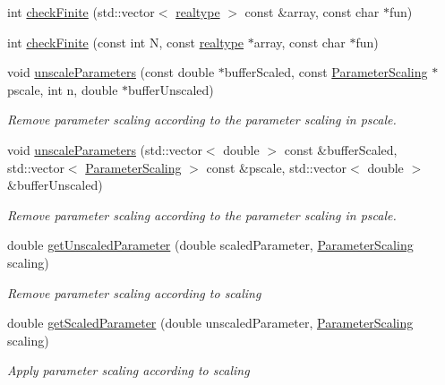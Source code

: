 \begin{DoxyCompactItemize}
int \mbox{\hyperlink{namespaceamici_a1c2cd160b1b5061e19257f2a7947c8ed}{check\+Finite}} (std\+::vector$<$ \mbox{\hyperlink{namespaceamici_a1bdce28051d6a53868f7ccbf5f2c14a3}{realtype}} $>$ const \&array, const char $\ast$fun)
\item 
int \mbox{\hyperlink{namespaceamici_aeb0886d5a74ea04eeef52219063aa7d4}{check\+Finite}} (const int N, const \mbox{\hyperlink{namespaceamici_a1bdce28051d6a53868f7ccbf5f2c14a3}{realtype}} $\ast$array, const char $\ast$fun)
\item 
void \mbox{\hyperlink{namespaceamici_af7d0af67f181a659c78b7aa2bbaaf718}{unscale\+Parameters}} (const double $\ast$buffer\+Scaled, const \mbox{\hyperlink{namespaceamici_a42f062082226e9284c201d9eab71a3a0}{Parameter\+Scaling}} $\ast$pscale, int n, double $\ast$buffer\+Unscaled)
\begin{DoxyCompactList}\small\item\em Remove parameter scaling according to the parameter scaling in pscale. \end{DoxyCompactList}\item 
void \mbox{\hyperlink{namespaceamici_a431c1153fbdccf5ab726863030bc2701}{unscale\+Parameters}} (std\+::vector$<$ double $>$ const \&buffer\+Scaled, std\+::vector$<$ \mbox{\hyperlink{namespaceamici_a42f062082226e9284c201d9eab71a3a0}{Parameter\+Scaling}} $>$ const \&pscale, std\+::vector$<$ double $>$ \&buffer\+Unscaled)
\begin{DoxyCompactList}\small\item\em Remove parameter scaling according to the parameter scaling in pscale. \end{DoxyCompactList}\item 
double \mbox{\hyperlink{namespaceamici_a7e1720941869974da1ca8dbd6cd9e936}{get\+Unscaled\+Parameter}} (double scaled\+Parameter, \mbox{\hyperlink{namespaceamici_a42f062082226e9284c201d9eab71a3a0}{Parameter\+Scaling}} scaling)
\begin{DoxyCompactList}\small\item\em Remove parameter scaling according to {\ttfamily scaling} \end{DoxyCompactList}\item 
double \mbox{\hyperlink{namespaceamici_a9ef646fefe61eae18051851bbb2f3e5b}{get\+Scaled\+Parameter}} (double unscaled\+Parameter, \mbox{\hyperlink{namespaceamici_a42f062082226e9284c201d9eab71a3a0}{Parameter\+Scaling}} scaling)
\begin{DoxyCompactList}\small\item\em Apply parameter scaling according to {\ttfamily scaling} \end{DoxyCompactList}\item 

\end{DoxyCompactItemize}
